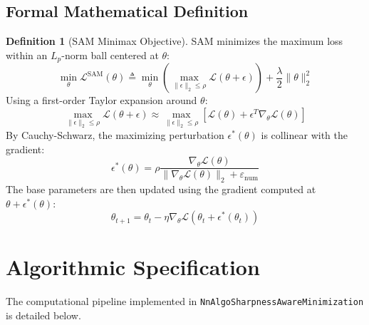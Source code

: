 \documentclass[11pt,a4paper]{article}
\theoremstyle{definition}
\newtheorem{definition}{Definition}[section]
\begin{document}
\subsection{Formal Mathematical Definition}
\begin{definition}[SAM Minimax Objective]
SAM minimizes the maximum loss within an $L_p$-norm ball centered at $\theta$:
\begin{equation}
\min_\theta \mathcal{L}^{\text{SAM}}(\theta) \triangleq \min_\theta \left( \max_{\|\epsilon\|_2 \le \rho} \mathcal{L}(\theta + \epsilon) \right) + \frac{\lambda}{2} \|\theta\|_2^2 \label{eq:sam_obj}
\end{equation}
Using a first-order Taylor expansion around $\theta$:
\begin{equation}
\max_{\|\epsilon\|_2 \le \rho} \mathcal{L}(\theta + \epsilon) \approx \max_{\|\epsilon\|_2 \le \rho} \left[ \mathcal{L}(\theta) + \epsilon^T \nabla_\theta \mathcal{L}(\theta) \right]
\end{equation}
By Cauchy-Schwarz, the maximizing perturbation $\epsilon^*(\theta)$ is collinear with the gradient:
\begin{equation}
\epsilon^*(\theta) = \rho \frac{\nabla_\theta \mathcal{L}(\theta)}{\|\nabla_\theta \mathcal{L}(\theta)\|_2 + \varepsilon_{\text{num}}} \label{eq:sam_pert}
\end{equation}
The base parameters are then updated using the gradient computed at $\theta + \epsilon^*(\theta)$:
\begin{equation}
\theta_{t+1} = \theta_t - \eta \nabla_\theta \mathcal{L}(\theta_t + \epsilon^*(\theta_t)) \label{eq:sam_update}
\end{equation}
\end{definition}

\section{Algorithmic Specification}

The computational pipeline implemented in \texttt{NnAlgoSharpnessAwareMinimization} is detailed below.
\end{document}
